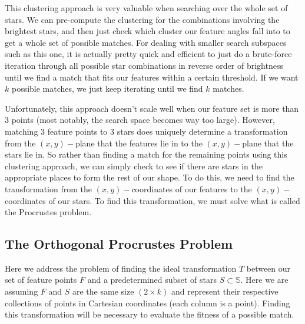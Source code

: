 \documentclass[paper=a4, fontsize=11pt]{scrartcl} %
\begin{document}
This clustering approach is very valuable when searching over the whole set of stars. We can pre-compute the clustering for the combinations involving the brightest stars, and then just check which cluster our feature angles fall into to get a whole set of possible matches. For dealing with smaller search subspaces such as this one, it is actually pretty quick and efficient to just do a brute-force iteration through all possible star combinations in reverse order of brightness until we find a match that fits our features within a certain threshold. If we want $k$ possible matches, we just keep iterating until we find $k$ matches.



Unfortunately, this approach doesn't scale well when our feature set is more than 3 points (most notably, the search space becomes way too large). However, matching 3 feature points to 3 stars does uniquely determine a transformation from the $(x,y)-$plane that the features lie in to the $(x,y)-$plane that the stars lie in. So rather than finding a match for the remaining points using this clustering approach, we can simply check to see if there are stars in the appropriate places to form the rest of our shape. To do this, we need to find the transformation from the $(x,y)-$coordinates of our features to the $(x,y)-$coordinates of our stars. To find this transformation, we must solve what is called the Procrustes problem.

\subsection{The Orthogonal Procrustes Problem\cite{Everson1997}}
Here we address the problem of finding the ideal transformation $T$ between our set of feature points $F$ and a predetermined subset of stars $S\subset \mathbb{S}$. Here we are assuming $F$ and $S$ are the same size $(2\times k)$ and represent their respective collections of points in Cartesian coordinates (each column is a point).  Finding this transformation will be necessary to evaluate the fitness of a possible match.
\end{document}
